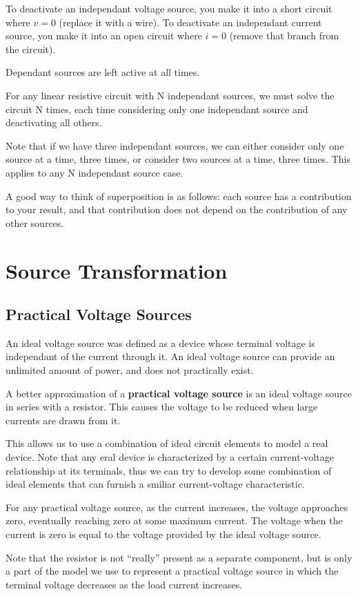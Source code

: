 \documentclass[12pt]{article}
\begin{document}
To deactivate an independant voltage source, you make it into a short circuit where $v = 0$ (replace it with a wire). To deactivate an independant current source, you make it into an open circuit where $i = 0$ (remove that branch from the circuit).

Dependant sources are left active at all times.

For any linear resistive circuit with N independant sources, we must solve the circuit N times, each time considering only one independant source and deactivating all others.

Note that if we have three independant sources, we can either consider only one source at a time, three times, or consider two sources at a time, three times. This applies to any N independant source case.

A good way to think of superposition is as follows: each source has a contribution to your result, and that contribution does not depend on the contribution of any other sources.

\section*{Source Transformation}
\subsection*{Practical Voltage Sources}
An ideal voltage source was defined as a device whose terminal voltage is independant of the current through it. An ideal voltage source can provide an unlimited amount of power, and does not practically exist.

A better approximation of a {\bf practical voltage source} is an ideal voltage source in series with a resistor. This causes the voltage to be reduced when large currents are drawn from it.

This allows us to use a combination of ideal circuit elements to model a real device. Note that any eral device is characterized by a certain current-voltage relationship at its terminals, thus we can try to develop some combination of ideal elements that can furnish a smiliar current-voltage characteristic.

For any practical voltage source, as the current increases, the voltage approaches zero, eventually reaching zero at some maximum current. The voltage when the current is zero is equal to the voltage provided by the ideal voltage source.

Note that the resistor is not ``really'' present as a separate component, but is only a part of the model we use to represent a practical voltage source in which the terminal voltage decreases as the load current increases.
\end{document}
